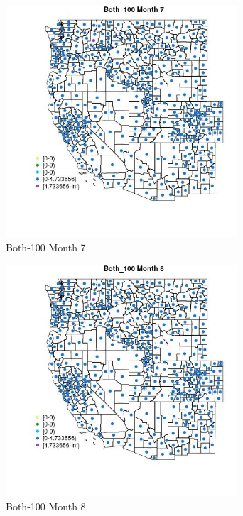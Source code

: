 \begin{figure} 
\centering  
\includegraphics[width=0.77\textwidth]{Code_Outputs/df_report_ML_predictors_CountyCentroid_Locations_Dates_2008-01-01to2018-12-31_MapObsMo7Both_100.jpg} 
\caption{\label{fig:df_report_ML_predictors_CountyCentroid_Locations_Dates_2008-01-01to2018-12-31MapObsMo7Both_100}Both-100 Month 7} 
\end{figure} 
 

\clearpage 

\begin{figure} 
\centering  
\includegraphics[width=0.77\textwidth]{Code_Outputs/df_report_ML_predictors_CountyCentroid_Locations_Dates_2008-01-01to2018-12-31_MapObsMo8Both_100.jpg} 
\caption{\label{fig:df_report_ML_predictors_CountyCentroid_Locations_Dates_2008-01-01to2018-12-31MapObsMo8Both_100}Both-100 Month 8} 
\end{figure} 
 

